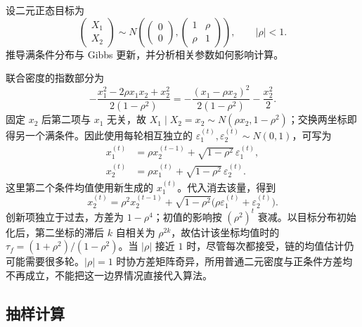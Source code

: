 \begin{example}
\label{ex:lh-mcmc-gaussian-gibbs}
设二元正态目标为
\[
\begin{pmatrix}X_1\\X_2\end{pmatrix}
\sim N\!\left(\begin{pmatrix}0\\0\end{pmatrix},
\begin{pmatrix}1&\rho\\\rho&1\end{pmatrix}\right),\qquad |\rho|<1.
\]
推导满条件分布与 Gibbs 更新，并分析相关参数如何影响计算。
\end{example}
\begin{solve}
联合密度的指数部分为
\[
-\frac{x_1^2-2\rho x_1x_2+x_2^2}{2(1-\rho^2)}
=-\frac{(x_1-\rho x_2)^2}{2(1-\rho^2)}-\frac{x_2^2}{2}.
\]
固定 $x_2$ 后第二项与 $x_1$ 无关，故 $X_1\mid X_2=x_2\sim N(\rho x_2,1-\rho^2)$；交换两坐标即得另一个满条件。因此使用每轮相互独立的 $\varepsilon_1^{(t)},\varepsilon_2^{(t)}\sim N(0,1)$，可写为
\begin{equation}
\begin{aligned}
x_1^{(t)}&=\rho x_2^{(t-1)}+\sqrt{1-\rho^2}\,\varepsilon_1^{(t)},\\
x_2^{(t)}&=\rho x_1^{(t)}+\sqrt{1-\rho^2}\,\varepsilon_2^{(t)}.
\end{aligned}
\label{eq:lh-mcmc-gaussian-gibbs}
\end{equation}
这里第二个条件均值使用新生成的 $x_1^{(t)}$。代入消去该量，得到
\[
x_2^{(t)}=\rho^2x_2^{(t-1)}
+\sqrt{1-\rho^2}\bigl(\rho\varepsilon_1^{(t)}+\varepsilon_2^{(t)}\bigr).
\]
创新项独立于过去，方差为 $1-\rho^4$；初值的影响按 $(\rho^2)^t$ 衰减。以目标分布初始化后，第二坐标的滞后 $k$ 自相关为 $\rho^{2k}$，故估计该坐标均值时的 $\tau_f=(1+\rho^2)/(1-\rho^2)$。当 $|\rho|$ 接近 $1$ 时，尽管每次都接受，链的均值估计仍可能需要很多轮。$|\rho|=1$ 时协方差矩阵奇异，所用普通二元密度与正条件方差均不再成立，不能把这一边界情况直接代入算法。
\end{solve}

\subsection{抽样计算}
\label{subsec:lh-mcmc-gibbs-computation}

